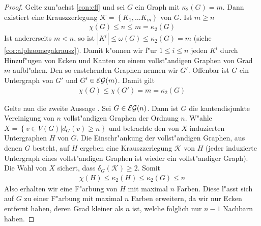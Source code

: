 \begin{proof}
  Gelte zun"achst \ref{con:efl} und sei $G$ ein Graph mit $\kappa_{2}(G) =m$. Dann existiert eine Krauszzerlegung $\mathcal{K} = \left\{ K_1,\dots K_m \right\}$ von $G$. Ist $m \geq n$
  \begin{align*}
    \chi(G) \leq n \leq m = \kappa_2 (G)
  \end{align*}
  Ist andererseits $m< n $, so ist $|K^{i}| \leq \omega (G)  \leq \kappa_2 (G) =  m$ (siehe \ref{cor:alphaomegakrausz}). Damit k"onnen wir f"ur $1\leq i \leq n$ jeden $K^{i}$ durch Hinzuf"ugen von Ecken und Kanten zu einem vollst"andigen Graphen von Grad $m$ aufbl"ahen. Den so enstehenden Graphen nennen wir $G'$. Offenbar ist $G$ ein Untergraph von $G'$ und $G'\in {\cal EG}(m)$. Damit gilt 
  \begin{align*}
    \chi(G) \leq \chi (G') = m = \kappa_{2}(G)
  \end{align*}

  Gelte nun die zweite Aussage . Sei $G\in {\cal EG}(n)$. Dann ist $G$ die kantendisjunkte Vereinigung von $n$ vollst"andigen Graphen der Ordnung $n$. W"ahle $X= \left\{ v\in V(G) | d_G(v) \geq n \right\}$ und betrachte den von $X$ induzierten Untergraphen $H$ von $G$. Die Einschr"ankung der vollst"andigen Graphen, aus denen $G$ besteht, auf $H$ ergeben eine Krauszzerlegung $\mathcal{K}$ von $H$ (jeder induzierte Untergraph eines vollst"andigen Graphen ist wieder ein vollst"andiger
  Graph). Die Wahl von $X$ sichert, dass $\delta_G(\mathcal K) \geq 2$. Somit 
  \begin{align*}
    \chi(H) \leq \kappa_{2}(H) \leq \kappa_{2}(G) \leq n
  \end{align*}
  Also erhalten wir eine F"arbung von $H$ mit maximal $n$ Farben. Diese l"asst sich auf $G$ zu einer F"arbung mit maximal $n$ Farben erweitern, da wir nur Ecken entfernt haben, deren Grad kleiner als $n$ ist, welche folglich nur $n-1$ Nachbarn haben. 


\end{proof}
